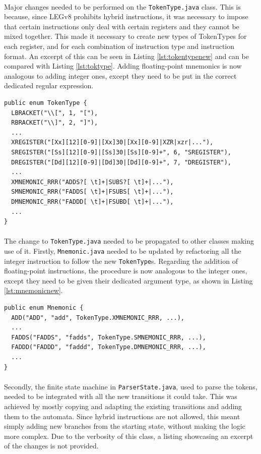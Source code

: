 \paragraph{}
Major changes needed to be performed on the \verb|TokenType.java| class. This is because, since LEGv8 prohibits hybrid instructions, it was necessary to impose that certain instructions only deal with certain registers and they cannot be mixed together. This made it necessary to create new types of TokenTypes for each register, and for each combination of instruction type and instruction format. An excerpt of this can be seen in Listing \ref{lst:tokentypenew} and can be compared with Listing \ref{lst:toktype}. Adding floating-point mnemonics is now analogous to adding integer ones, except they need to be put in the correct dedicated regular expression.
\begin{lstlisting}[float, caption={Refactoring of TokenType}, label={lst:tokentypenew}]
public enum TokenType {	
  LBRACKET("\\[", 1, "["),
  RBRACKET("\\]", 2, "]"),
  ...
  XREGISTER("[Xx][12][0-9]|[Xx]30|[Xx][0-9]|XZR|xzr|..."),
  SREGISTER("[Ss][12][0-9]|[Ss]30|[Ss][0-9]+", 6, "SREGISTER"),
  DREGISTER("[Dd][12][0-9]|[Dd]30|[Dd][0-9]+", 7, "DREGISTER"),
  ...
  XMNEMONIC_RRR("ADDS?[ \t]+|SUBS?[ \t]+|..."),
  SMNEMONIC_RRR("FADDS[ \t]+|FSUBS[ \t]+|..."),
  DMNEMONIC_RRR("FADDD[ \t]+|FSUBD[ \t]+|..."),
  ...
}
\end{lstlisting}
\paragraph{}
The change to \verb|TokenType.java| needed to be propagated to other classes making use of it. Firstly, \verb|Mnemonic.java| needed to be updated by refactoring all the integer instruction to follow the new \verb|TokenType|s. Regarding the addition of floating-point instructions, the procedure is now analogous to the integer ones, except they need to be given their dedicated argument type, as shown in Listing \ref{lst:mnemonicnew}.
\begin{lstlisting}[float, caption={Updated Mnemonic.java}, label={lst:mnemonicnew}]
public enum Mnemonic {
  ADD("ADD", "add", TokenType.XMNEMONIC_RRR, ...),
  ...
  FADDS("FADDS", "fadds", TokenType.SMNEMONIC_RRR, ...),
  FADDD("FADDD", "faddd", TokenType.DMNEMONIC_RRR, ...),
  ...
}
\end{lstlisting}
\paragraph{}
Secondly, the finite state machine in \verb|ParserState.java|, used to parse the tokens, needed to be integrated with all the new transitions it could take. This was achieved by mostly copying and adapting the existing transitions and adding them to the automata. Since hybrid instructions are not allowed, this meant simply adding new branches from the starting state, without making the logic more complex. Due to the verbosity of this class, a listing showcasing an excerpt of the changes is not provided.
